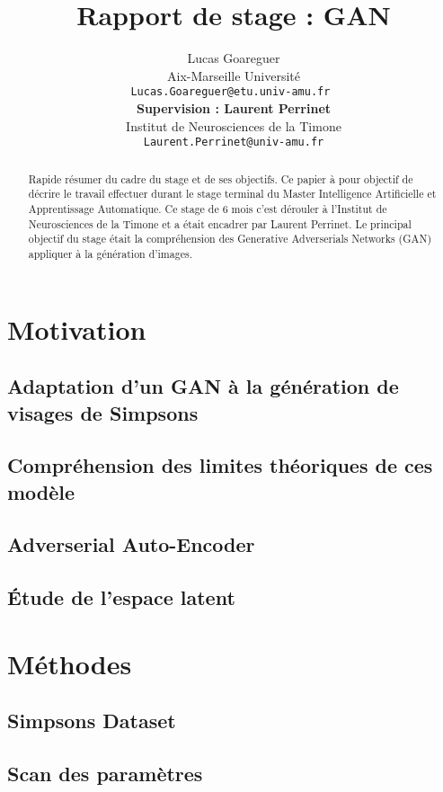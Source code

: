 \documentclass[11pt]{article}
\title{Rapport de stage : GAN}
\author{Lucas Goareguer \\
  Aix-Marseille Université \\
  \texttt{Lucas.Goareguer@etu.univ-amu.fr   } \\\And
   {\bf Supervision : Laurent Perrinet} \\
  Institut de Neurosciences de la Timone \\
  {\tt Laurent.Perrinet@univ-amu.fr} \\}
\date{}
\begin{document}
\maketitle
\begin{abstract}
Rapide résumer du cadre du stage et de ses objectifs.
Ce papier à pour objectif de décrire le travail effectuer durant le stage terminal du Master Intelligence Artificielle et Apprentissage Automatique.
Ce stage de 6 mois c'est dérouler à l'Institut de Neurosciences de la Timone et a était encadrer par Laurent Perrinet.
Le principal objectif du stage était la compréhension des Generative Adverserials Networks (GAN) appliquer à la génération d'images.
\end{abstract}


\section{Motivation}

\subsection{Adaptation d'un GAN à la génération de visages de Simpsons}
\subsection{Compréhension des limites théoriques de ces modèle}
\subsection{Adverserial Auto-Encoder}
\subsection{Étude de l'espace latent}

\section{Méthodes}

\subsection{Simpsons Dataset}
\subsection{Scan des paramètres}
\end{document}
